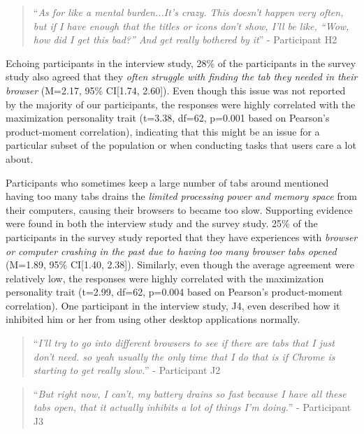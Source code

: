 \begin{quote}
``\emph{As for like a mental burden...It's crazy. This doesn't happen very often, but if I have enough that the titles or icons don't show, I'll be like, ``Wow, how did I get this bad?'' And get really bothered by it}'' -  Participant H2
\end{quote}

Echoing participants in the interview study, 28\% of the participants  in the survey study also agreed that they \emph{often struggle with finding the tab they needed in their browser} (M=2.17, 95\% CI[1.74, 2.60]). Even though this issue was not reported by the majority of our participants, the responses were highly correlated with the maximization personality trait (t=3.38, df=62, p=0.001 based on Pearson's product-moment correlation), indicating that this might be an issue for a particular subset of the population or when conducting tasks that users care a lot about.

Participants who sometimes keep a large number of tabs around mentioned having too many tabs drains the \emph{limited processing power and memory space} from their computers, causing their browsers to became too slow. Supporting evidence were found in both the interview study and the survey study. 25\% of the participants in the survey study reported that they have experiences with \emph{browser or computer crashing in the past due to having too many browser tabs opened} (M=1.89, 95\% CI[1.40, 2.38]). Similarly, even though the average agreement were relatively low, the responses were highly correlated with the maximization personality trait (t=2.99, df=62, p=0.004 based on Pearson's product-moment correlation). One participant in the interview study, J4, even described how it inhibited him or her from using other desktop applications normally. 

\begin{quote}
``\emph{I'll try to go into different browsers to see if there are tabs that I just don't need. so yeah usually the only time that I do that is if Chrome is starting to get really slow.}'' - Participant J2

\end{quote}
\begin{quote}
``\emph{But right now, I can't, my battery drains so fast because I have all these tabs open, that it actually inhibits a lot of things I'm doing.}'' - Participant J3
\end{quote}

